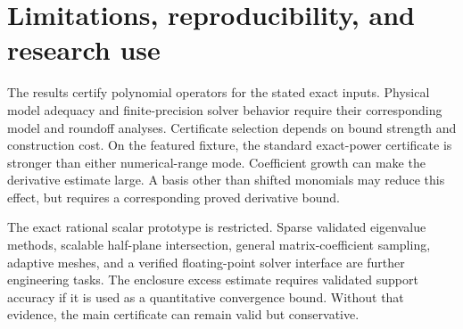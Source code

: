 \documentclass[11pt]{article}
\theoremstyle{definition}
\theoremstyle{remark}
\numberwithin{equation}{section}
\begin{document}
\section{Limitations, reproducibility, and research use}\label{sec:limits}
The results certify polynomial operators for the stated exact inputs.
Physical model adequacy and finite-precision solver behavior require
their corresponding model and roundoff analyses. Certificate selection
depends on bound strength and construction cost.
On the featured fixture, the standard exact-power certificate is stronger
than either numerical-range mode.
Coefficient growth can make the derivative estimate large.
A basis other than shifted monomials may reduce this effect, but requires a
corresponding proved derivative bound.

The exact rational scalar prototype is restricted.
Sparse validated eigenvalue methods, scalable half-plane intersection,
general matrix-coefficient sampling, adaptive meshes, and a verified
floating-point solver interface are further engineering tasks.
The enclosure excess estimate requires validated support accuracy if it is
used as a quantitative convergence bound.
Without that evidence, the main certificate can remain valid but
conservative.
\end{document}
